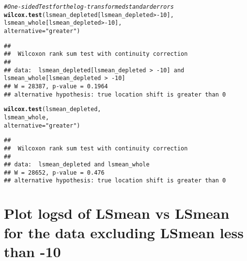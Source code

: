 \documentclass{article}\usepackage[]{graphicx}\usepackage[]{color}
\makeatletter
\newcommand{\hlnum}[1]{\textcolor[rgb]{0.686,0.059,0.569}{#1}}%
\newcommand{\hlstr}[1]{\textcolor[rgb]{0.192,0.494,0.8}{#1}}%
\newcommand{\hlcom}[1]{\textcolor[rgb]{0.678,0.584,0.686}{\textit{#1}}}%
\newcommand{\hlopt}[1]{\textcolor[rgb]{0,0,0}{#1}}%
\newcommand{\hlstd}[1]{\textcolor[rgb]{0.345,0.345,0.345}{#1}}%
\newcommand{\hlkwc}[1]{\textcolor[rgb]{0.333,0.667,0.333}{#1}}%
\newcommand{\hlkwd}[1]{\textcolor[rgb]{0.737,0.353,0.396}{\textbf{#1}}}%
\newenvironment{kframe}{%
 \def\at@end@of@kframe{}%
 \ifinner\ifhmode%
  \def\at@end@of@kframe{\end{minipage}}%
  \begin{minipage}{\columnwidth}%
 \fi\fi%
 \def\FrameCommand##1{\hskip\@totalleftmargin \hskip-\fboxsep
 \colorbox{shadecolor}{##1}\hskip-\fboxsep
     \hskip-\linewidth \hskip-\@totalleftmargin \hskip\columnwidth}%
 \MakeFramed {\advance\hsize-\width
   \@totalleftmargin\z@ \linewidth\hsize
   \@setminipage}}%
 {\par\unskip\endMakeFramed%
 \at@end@of@kframe}
\newenvironment{knitrout}{}{} %
\makeatother
\begin{document}
\begin{knitrout}
\color{fgcolor}\begin{kframe}
\begin{alltt}
\hlcom{# One-sided Test for the log-transformed standard errors}
\hlkwd{wilcox.test}\hlstd{(lsmean_depleted[lsmean_depleted} \hlopt{>-}\hlnum{10}\hlstd{],}
            \hlstd{lsmean_whole[lsmean_depleted} \hlopt{>-}\hlnum{10}\hlstd{],}
            \hlkwc{alternative} \hlstd{=}\hlstr{"greater"}\hlstd{)}
\end{alltt}
\begin{verbatim}
## 
## 	Wilcoxon rank sum test with continuity correction
## 
## data:  lsmean_depleted[lsmean_depleted > -10] and lsmean_whole[lsmean_depleted > -10]
## W = 28387, p-value = 0.1964
## alternative hypothesis: true location shift is greater than 0
\end{verbatim}
\begin{alltt}
\hlkwd{wilcox.test}\hlstd{(lsmean_depleted,}
            \hlstd{lsmean_whole,}
            \hlkwc{alternative} \hlstd{=}\hlstr{"greater"}\hlstd{)}
\end{alltt}
\begin{verbatim}
## 
## 	Wilcoxon rank sum test with continuity correction
## 
## data:  lsmean_depleted and lsmean_whole
## W = 28652, p-value = 0.476
## alternative hypothesis: true location shift is greater than 0
\end{verbatim}
\end{kframe}
\end{knitrout}


\section{Plot logsd of LSmean vs LSmean for the data excluding LSmean less than -10}
\end{document}
